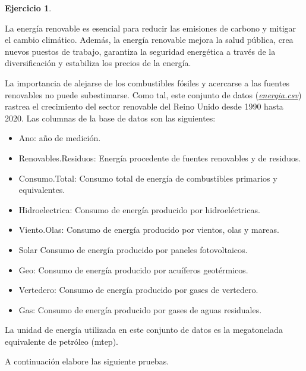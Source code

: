 \documentclass[
  11pt,
]{book}
\providecommand{\tightlist}{%
  \setlength{\itemsep}{0pt}\setlength{\parskip}{0pt}}
\theoremstyle{definition}
\theoremstyle{definition}
\theoremstyle{definition}
\newtheorem{exercise}{Ejercicio}[chapter]
\theoremstyle{definition}
\theoremstyle{remark}
\begin{document}
\begin{exercise}
\protect\hypertarget{exr:energia}{}\label{exr:energia}

La energía renovable es esencial para reducir las emisiones de carbono y mitigar el cambio climático. Además, la energía renovable mejora la salud pública, crea nuevos puestos de trabajo, garantiza la seguridad energética a través de la diversificación y estabiliza los precios de la energía.

La importancia de alejarse de los combustibles fósiles y acercarse a las fuentes renovables no puede subestimarse. Como tal, este conjunto de datos (\href{https://raw.githubusercontent.com/Dfranzani/Bases-de-datos-para-cursos/main/2022-2/Estad\%C3\%ADstica\%202/energia.csv}{\emph{energia.csv}}) rastrea el crecimiento del sector renovable del Reino Unido desde 1990 hasta 2020. Las columnas de la base de datos son las siguientes:

\begin{itemize}
\tightlist
\item
  Ano: año de medición.
\item
  Renovables.Residuos: Energía procedente de fuentes renovables y de residuos.
\item
  Consumo.Total: Consumo total de energía de combustibles primarios y equivalentes.
\item
  Hidroelectrica: Consumo de energía producido por hidroeléctricas.
\item
  Viento.Olas: Consumo de energía producido por vientos, olas y mareas.
\item
  Solar Consumo de energía producido por paneles fotovoltaicos.
\item
  Geo: Consumo de energía producido por acuíferos geotérmicos.
\item
  Vertedero: Consumo de energía producido por gases de vertedero.
\item
  Gas: Consumo de energía producido por gases de aguas residuales.
\end{itemize}

La unidad de energía utilizada en este conjunto de datos es la megatonelada equivalente de petróleo (mtep).

A continuación elabore las siguiente pruebas.


\end{exercise}
\end{document}
